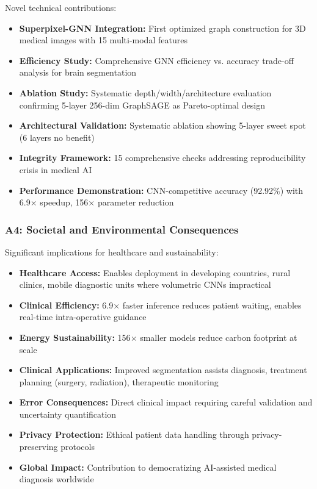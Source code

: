 Novel technical contributions:

\begin{itemize}
    \item \textbf{Superpixel-GNN Integration:} First optimized graph construction for 3D medical images with 15 multi-modal features
    \item \textbf{Efficiency Study:} Comprehensive GNN efficiency vs. accuracy trade-off analysis for brain segmentation
    \item \textbf{Ablation Study:} Systematic depth/width/architecture evaluation confirming 5-layer 256-dim GraphSAGE as Pareto-optimal design
    \item \textbf{Architectural Validation:} Systematic ablation showing 5-layer sweet spot (6 layers no benefit)
    \item \textbf{Integrity Framework:} 15 comprehensive checks addressing reproducibility crisis in medical AI
    \item \textbf{Performance Demonstration:} CNN-competitive accuracy (92.92\%) with 6.9$\times$ speedup, 156$\times$ parameter reduction
\end{itemize}

\subsubsection*{A4: Societal and Environmental Consequences}

Significant implications for healthcare and sustainability:

\begin{itemize}
    \item \textbf{Healthcare Access:} Enables deployment in developing countries, rural clinics, mobile diagnostic units where volumetric CNNs impractical
    \item \textbf{Clinical Efficiency:} 6.9$\times$ faster inference reduces patient waiting, enables real-time intra-operative guidance
    \item \textbf{Energy Sustainability:} 156$\times$ smaller models reduce carbon footprint at scale
    \item \textbf{Clinical Applications:} Improved segmentation assists diagnosis, treatment planning (surgery, radiation), therapeutic monitoring
    \item \textbf{Error Consequences:} Direct clinical impact requiring careful validation and uncertainty quantification
    \item \textbf{Privacy Protection:} Ethical patient data handling through privacy-preserving protocols
    \item \textbf{Global Impact:} Contribution to democratizing AI-assisted medical diagnosis worldwide
\end{itemize}

